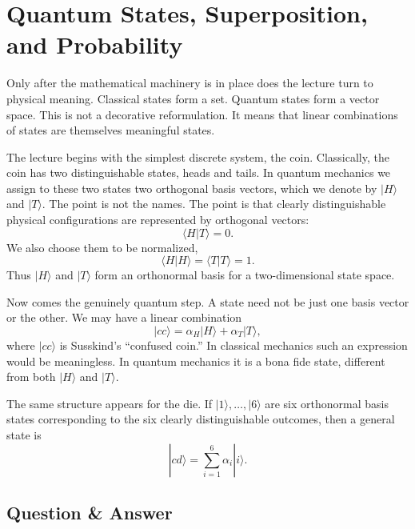 \section{Quantum States, Superposition, and Probability}

Only after the mathematical machinery is in place does the lecture turn to physical meaning. Classical states form a set. Quantum states form a vector space. This is not a decorative reformulation. It means that linear combinations of states are themselves meaningful states.

The lecture begins with the simplest discrete system, the coin. Classically, the coin has two distinguishable states, heads and tails. In quantum mechanics we assign to these two states two orthogonal basis vectors, which we denote by \(|H\rangle\) and \(|T\rangle\). The point is not the names. The point is that clearly distinguishable physical configurations are represented by orthogonal vectors:
\begin{equation}
\langle H|T\rangle = 0.
\end{equation}
We also choose them to be normalized,
\begin{equation}
\langle H|H\rangle = \langle T|T\rangle = 1.
\end{equation}
Thus \(|H\rangle\) and \(|T\rangle\) form an orthonormal basis for a two-dimensional state space.

Now comes the genuinely quantum step. A state need not be just one basis vector or the other. We may have a linear combination
\begin{equation}
|cc\rangle = \alpha_H |H\rangle + \alpha_T |T\rangle,
\end{equation}
where \(|cc\rangle\) is Susskind's ``confused coin.'' In classical mechanics such an expression would be meaningless. In quantum mechanics it is a bona fide state, different from both \(|H\rangle\) and \(|T\rangle\).

The same structure appears for the die. If \(|1\rangle,\dots,|6\rangle\) are six orthonormal basis states corresponding to the six clearly distinguishable outcomes, then a general state is
\begin{equation}
|cd\rangle = \sum_{i=1}^6 \alpha_i |i\rangle.
\end{equation}

\subsection{Question \& Answer}

